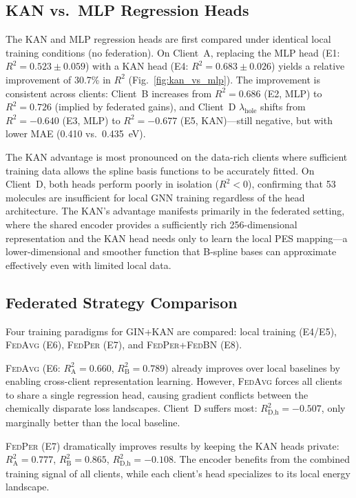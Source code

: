 \documentclass[twocolumn]{article}
\newcommand{\lamhole}{\lambda_{\text{hole}}}
\newcommand{\Rsq}{R^{2}}
\newcommand{\FedPer}{\textsc{FedPer}}
\newcommand{\FedBN}{\textsc{FedBN}}
\newcommand{\FedAvg}{\textsc{FedAvg}}
\begin{document}
\subsection{KAN vs.\ MLP Regression Heads}\label{sec:kan_vs_mlp}

The KAN and MLP regression heads are first compared under identical local training conditions (no federation).
On Client~A, replacing the MLP head (E1: $\Rsq = 0.523 \pm 0.059$) with a KAN head (E4: $\Rsq = 0.683 \pm 0.026$) yields a relative improvement of 30.7\% in $\Rsq$ (Fig.~\ref{fig:kan_vs_mlp}).
The improvement is consistent across clients: Client~B increases from $\Rsq = 0.686$ (E2, MLP) to $\Rsq = 0.726$ (implied by federated gains), and Client~D $\lamhole$ shifts from $\Rsq = -0.640$ (E3, MLP) to $\Rsq = -0.677$ (E5, KAN)---still negative, but with lower MAE (0.410 vs.\ 0.435~eV).

The KAN advantage is most pronounced on the data-rich clients where sufficient training data allows the spline basis functions to be accurately fitted.
On Client~D, both heads perform poorly in isolation ($\Rsq < 0$), confirming that 53 molecules are insufficient for local GNN training regardless of the head architecture.
The KAN's advantage manifests primarily in the federated setting, where the shared encoder provides a sufficiently rich 256-dimensional representation and the KAN head needs only to learn the local PES mapping---a lower-dimensional and smoother function that B-spline bases can approximate effectively even with limited local data.

\subsection{Federated Strategy Comparison}\label{sec:fed_strategy}

Four training paradigms for GIN+KAN are compared: local training (E4/E5), \FedAvg{} (E6), \FedPer{} (E7), and \FedPer{}+\FedBN{} (E8).

\FedAvg{} (E6: $\Rsq_\text{A} = 0.660$, $\Rsq_\text{B} = 0.789$) already improves over local baselines by enabling cross-client representation learning.
However, \FedAvg{} forces all clients to share a single regression head, causing gradient conflicts between the chemically disparate loss landscapes.
Client~D suffers most: $\Rsq_{\text{D,h}} = -0.507$, only marginally better than the local baseline.

\FedPer{} (E7) dramatically improves results by keeping the KAN heads private: $\Rsq_\text{A} = 0.777$, $\Rsq_\text{B} = 0.865$, $\Rsq_{\text{D,h}} = -0.108$.
The encoder benefits from the combined training signal of all clients, while each client's head specializes to its local energy landscape.
\end{document}
